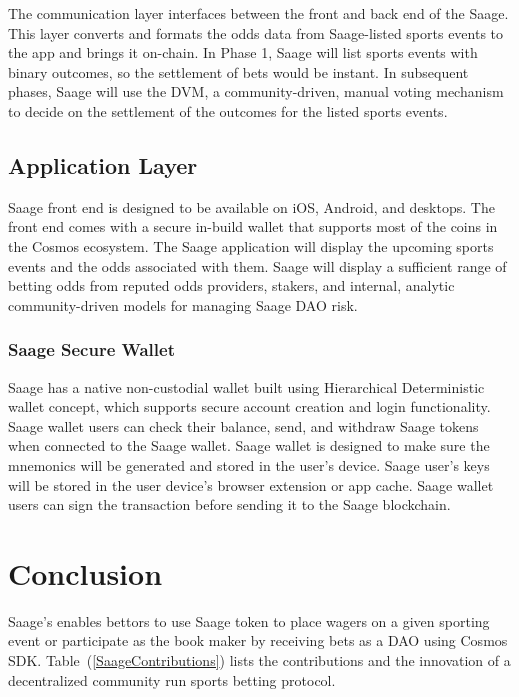 \documentclass[%
 reprint,
 amsmath,amssymb,
 aps,
]{revtex4-2}
\begin{document}
The communication layer interfaces between the front and back end of the Saage. This layer converts and formats the odds data from Saage-listed sports events to the app and brings it on-chain. In Phase 1, Saage will list sports events with binary outcomes, so the settlement of bets would be instant. In subsequent phases, Saage will use the DVM, a community-driven, manual voting mechanism to decide on the settlement of the outcomes for the listed sports events. 

\subsection{Application Layer} 

Saage front end is designed to be available on iOS, Android, and desktops. The front end comes with a secure in-build wallet that supports most of the coins in the Cosmos ecosystem. The Saage application will display the upcoming sports events and the odds associated with them. Saage will display a sufficient range of betting odds from reputed odds providers, stakers, and internal, analytic community-driven models for managing Saage DAO risk. 

\subsubsection{Saage Secure Wallet}\label{SaageSecureWallet}

Saage has a native non-custodial wallet built using Hierarchical Deterministic wallet concept, which supports secure account creation and login functionality. Saage wallet users can check their balance, send, and withdraw Saage tokens when connected to the Saage wallet. Saage wallet is designed to make sure the mnemonics will be generated and stored in the user’s device. Saage user’s keys will be stored in the user device’s browser extension or app cache. Saage wallet users can sign the transaction before sending it to the Saage blockchain.

\section{Conclusion}

Saage’s enables bettors to use Saage token to place wagers on a given sporting event or participate as the book maker by receiving bets as a DAO using Cosmos SDK.  Table~(\ref{SaageContributions}) lists the contributions and the innovation of a decentralized community run sports betting protocol.
\end{document}
